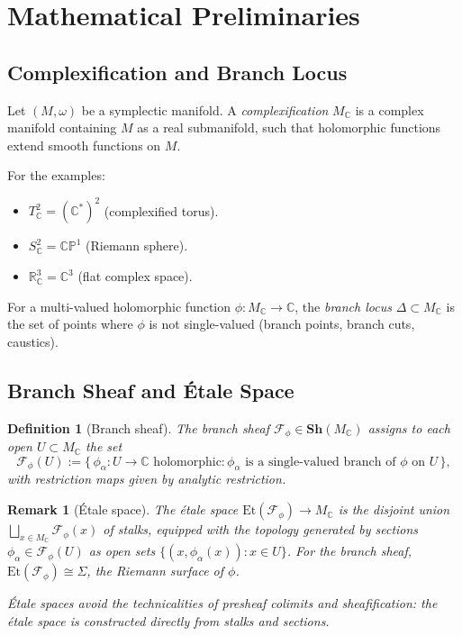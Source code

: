 \documentclass[11pt]{article}
\newtheorem{definition}[theorem]{Definition}
\newtheorem{remark}[theorem]{Remark}
\begin{document}
\section{Mathematical Preliminaries}

\subsection{Complexification and Branch Locus}

Let $(M, \omega)$ be a symplectic manifold. A \emph{complexification}
$M_\mathbb{C}$ is a complex manifold containing $M$ as a real submanifold,
such that holomorphic functions extend smooth functions on $M$.

For the examples:
\begin{itemize}
  \item $T^2_\mathbb{C} = (\mathbb{C}^*)^2$ (complexified torus).
  \item $S^2_\mathbb{C} = \mathbb{CP}^1$ (Riemann sphere).
  \item $\mathbb{R}^3_\mathbb{C} = \mathbb{C}^3$ (flat complex space).
\end{itemize}

For a multi-valued holomorphic function $\phi: M_\mathbb{C} \to \mathbb{C}$,
the \emph{branch locus} $\Delta \subset M_\mathbb{C}$ is the set of points
where $\phi$ is not single-valued (branch points, branch cuts, caustics).

\subsection{Branch Sheaf and Étale Space}

\begin{definition}[Branch sheaf]
\label{def:branch-sheaf}
The \emph{branch sheaf} $\mathcal{F}_\phi \in \mathbf{Sh}(M_\mathbb{C})$
assigns to each open $U \subset M_\mathbb{C}$ the set
\[
  \mathcal{F}_\phi(U) :=
  \bigl\{\,\phi_\alpha : U \to \mathbb{C}\text{ holomorphic}
    : \phi_\alpha \text{ is a single-valued branch of }\phi\text{ on }U
  \,\bigr\},
\]
with restriction maps given by analytic restriction.
\end{definition}

\begin{remark}[Étale space]
The \emph{étale space} $\mathrm{Et}(\mathcal{F}_\phi) \to M_\mathbb{C}$
is the disjoint union $\bigsqcup_{x \in M_\mathbb{C}} \mathcal{F}_\phi(x)$
of stalks, equipped with the topology generated by sections
$\phi_\alpha \in \mathcal{F}_\phi(U)$ as open sets
$\{(x, \phi_\alpha(x)) : x \in U\}$. For the branch sheaf,
$\mathrm{Et}(\mathcal{F}_\phi) \cong \Sigma$, the Riemann surface of $\phi$.

Étale spaces avoid the technicalities of presheaf colimits and
sheafification: the étale space is constructed directly from stalks
and sections.
\end{remark}
\end{document}
